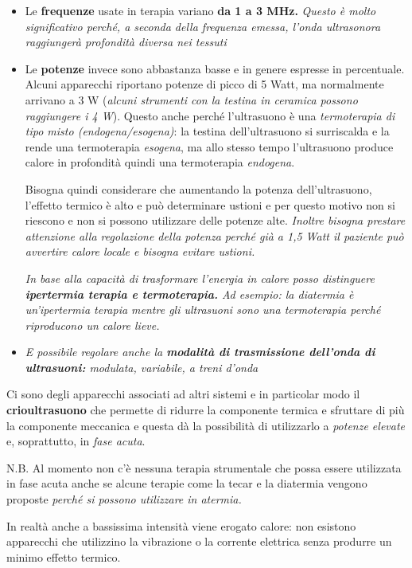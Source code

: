 \begin{itemize}
\item
  Le \textbf{frequenze} usate in terapia variano \textbf{da 1 a 3 MHz.}
  \emph{Questo è molto significativo perché, a seconda della frequenza
  emessa, l'onda ultrasonora raggiungerà profondità diversa nei tessuti}
\item
  Le \textbf{potenze} invece sono abbastanza basse e in genere espresse
  in percentuale. Alcuni apparecchi riportano potenze di picco di 5
  Watt, ma normalmente arrivano a 3 W (\emph{alcuni strumenti con la
  testina in ceramica possono raggiungere i 4 W}). Questo anche perché
  l'ultrasuono è una \emph{termoterapia di tipo misto
  (\emph{endogena/esogena})}: la testina dell'ultrasuono si surriscalda
  e la rende una termoterapia \emph{esogena}, ma allo stesso tempo
  l'ultrasuono produce calore in profondità quindi una termoterapia
  \emph{endogena}.

Bisogna quindi considerare che aumentando la potenza dell'ultrasuono,
l'effetto termico è alto e può determinare ustioni e per questo motivo
non si riescono e non si possono utilizzare delle potenze alte.
\emph{Inoltre bisogna prestare attenzione alla regolazione della potenza
perché già a 1,5 Watt il paziente può avvertire calore locale e bisogna
evitare ustioni.}

\emph{In base alla capacità di trasformare l'energia in calore posso
distinguere \textbf{ipertermia terapia e termoterapia.} Ad esempio: la
diatermia è un'ipertermia terapia mentre gli ultrasuoni sono una
termoterapia perché riproducono un calore lieve.}

\item
  \emph{E possibile regolare anche la \textbf{modalità di trasmissione
  dell'onda di ultrasuoni:} modulata, variabile, a treni d'onda}
\end{itemize}

Ci sono degli apparecchi associati ad altri sistemi e in particolar modo
il \textbf{crioultrasuono} che permette di ridurre la componente termica
e sfruttare di più la componente meccanica e questa dà la possibilità di
utilizzarlo a \emph{potenze elevate} e, soprattutto, in \emph{fase
acuta}.

N.B. Al momento non c'è nessuna terapia strumentale che possa essere
utilizzata in fase acuta anche se alcune terapie come la tecar e la
diatermia vengono proposte \emph{perché si possono utilizzare in
atermia. }

In realtà anche a bassissima intensità viene erogato calore: non
esistono apparecchi che utilizzino la vibrazione o la corrente elettrica
senza produrre un minimo effetto termico.

